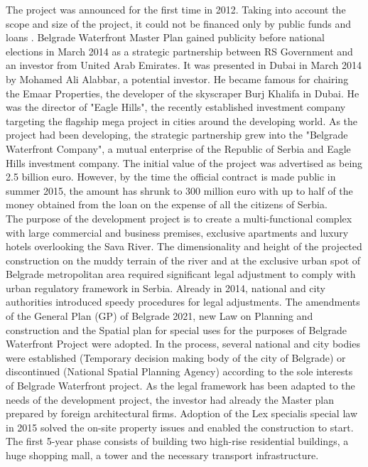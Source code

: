 \documentclass[11pt]{report}
\begin{document}
\begin{itemize}
The project was announced for the first time in 2012.
Taking into account the scope and size of the project, it could not be financed only by public funds and loans \cite{Vukmirovic in Doytchinov et al 2015}.
Belgrade  Waterfront Master Plan gained publicity before national elections in March 2014 as a strategic partnership between RS Government and an investor from United Arab Emirates. It was presented in Dubai in March 2014 by  Mohamed Ali Alabbar, a potential investor. He became famous for chairing the Emaar Properties, the developer of the  skyscraper Burj Khalifa in Dubai. He was the  director  of  "Eagle Hills", the recently established investment company targeting the  flagship mega project in cities around the developing world.
As the project had been developing, the strategic partnership grew into the "Belgrade Waterfront Company", a mutual enterprise of the Republic of Serbia and Eagle Hills investment company.
The initial value of the project was advertised as being 2.5 billion euro. However, by the time the official contract is made public in summer 2015, the amount has shrunk to 300 million euro with up to half of the money obtained from the loan on the expense of all the citizens of Serbia.
\\
The purpose  of  the  development  project  is  to  create  a multi-functional complex with large commercial and business premises, exclusive  apartments and luxury  hotels overlooking  the  Sava  River.
The dimensionality and height of the projected construction on the muddy terrain  of the river and at the exclusive urban spot of Belgrade metropolitan area required significant legal adjustment to comply with urban regulatory framework in Serbia. 
Already in 2014, national and city authorities introduced speedy procedures for legal adjustments. The amendments of the General Plan (GP) of Belgrade 2021, new Law on Planning and construction and the Spatial plan for special uses for the purposes of Belgrade Waterfront Project were adopted. In the process, several national and city bodies were established (Temporary decision making body of the city of Belgrade) or discontinued (National Spatial Planning Agency) according to the sole interests of Belgrade Waterfront project. As the legal framework has been adapted to the needs of the development project, the investor had already the Master plan prepared by foreign architectural firms.
Adoption of the Lex specialis special law in 2015 solved the on-site property issues and enabled the construction to start. The first 5-year phase consists of building two high-rise residential buildings, a huge shopping mall, a tower and the necessary transport infrastructure. 

\end{itemize}
\end{document}
